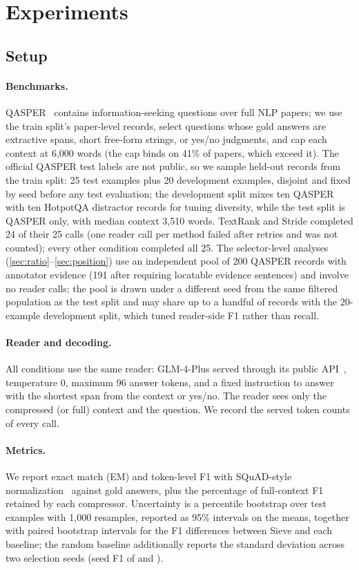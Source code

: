 \documentclass{article}
\newcommand{\method}{Sieve}
\begin{document}
\section{Experiments}
\label{sec:exp}

\subsection{Setup}
\label{sec:setup}

\paragraph{Benchmarks.}
QASPER~\citep{dasigi2021qasper} contains information-seeking questions
over full NLP papers; we use the train split's paper-level records,
select questions whose gold answers are extractive spans, short
free-form strings, or yes/no judgments, and cap each context at 6{,}000
words (the cap binds on 41\% of papers, which exceed it). The official
QASPER test labels are not public, so we sample held-out records from
the train split: 25 test examples plus 20 development examples, disjoint
and fixed by seed before any test evaluation; the development split
mixes ten QASPER with ten HotpotQA distractor records for tuning
diversity, while the test split is QASPER only, with median context
3{,}510 words. TextRank and Stride completed 24 of their 25 calls (one
reader call per method failed after retries and was not counted); every
other condition completed all 25. The
selector-level analyses (\autoref{sec:ratio}--\autoref{sec:position})
use an independent pool of 200 QASPER records with annotator evidence
(191 after requiring locatable evidence sentences) and involve no
reader calls; the pool is drawn under a different seed from the same
filtered population as the test split and may share up to a handful of
records with the 20-example development split, which tuned reader-side
F1 rather than recall.

\paragraph{Reader and decoding.}
All conditions use the same reader: GLM-4-Plus served through its public
API~\citep{glm2024chatglm}, temperature $0$, maximum 96 answer tokens,
and a fixed instruction to answer with the shortest span from the
context or yes/no. The reader sees only the compressed (or full) context
and the question. We record the served token counts of every call.

\paragraph{Metrics.}
We report exact match (EM) and token-level F1 with SQuAD-style
normalization~\citep{yang2018hotpotqa} against gold answers, plus the
percentage of full-context F1 retained by each compressor. Uncertainty is
a percentile bootstrap over test examples with 1{,}000 resamples,
reported as 95\% intervals on the means, together with paired
bootstrap intervals for the F1 differences between \method{} and each
baseline; the random baseline additionally
reports the standard deviation across two selection seeds (seed F1 of
\RandSeedA{} and \RandSeedB{}).
\end{document}
